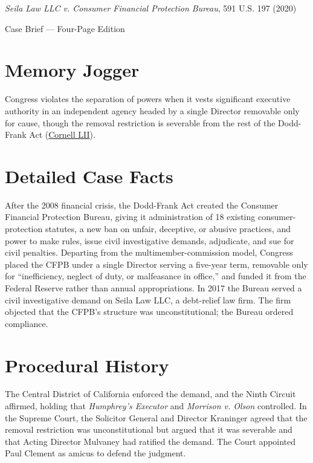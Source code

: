 \documentclass[12pt]{article}
\begin{document}
\begin{center}
{\LARGE \textit{Seila Law LLC v. Consumer Financial Protection Bureau}, 591 U.S. 197 (2020)\par}
\vspace{0.8em}
{\large Case Brief --- Four-Page Edition\par}
\end{center}
\vspace{1em}

\section{Memory Jogger}

Congress violates the separation of powers when it vests significant executive authority in an independent agency headed by a single Director removable only for cause, though the removal restriction is severable from the rest of the Dodd-Frank Act (\href{https://www.law.cornell.edu/supremecourt/text/19-7}{Cornell LII}).

\section{Detailed Case Facts}

After the 2008 financial crisis, the Dodd-Frank Act created the Consumer Financial Protection Bureau, giving it administration of 18 existing consumer-protection statutes, a new ban on unfair, deceptive, or abusive practices, and power to make rules, issue civil investigative demands, adjudicate, and sue for civil penalties. Departing from the multimember-commission model, Congress placed the CFPB under a single Director serving a five-year term, removable only for ``inefficiency, neglect of duty, or malfeasance in office,'' and funded it from the Federal Reserve rather than annual appropriations. In 2017 the Bureau served a civil investigative demand on Seila Law LLC, a debt-relief law firm. The firm objected that the CFPB's structure was unconstitutional; the Bureau ordered compliance.

\section{Procedural History}

The Central District of California enforced the demand, and the Ninth Circuit affirmed, holding that \textit{Humphrey's Executor} and \textit{Morrison v. Olson} controlled. In the Supreme Court, the Solicitor General and Director Kraninger agreed that the removal restriction was unconstitutional but argued that it was severable and that Acting Director Mulvaney had ratified the demand. The Court appointed Paul Clement as amicus to defend the judgment.
\end{document}
